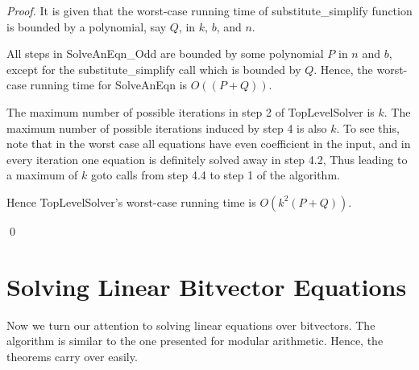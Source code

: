 \begin{proof}
It is given that the worst-case running time of substitute\_simplify
function is bounded by a polynomial, say $Q$, in $k$, $b$, and
$n$.

All steps in SolveAnEqn\_Odd are bounded by some polynomial $P$ in $n$
and $b$, except for the substitute\_simplify call which is bounded by
$Q$. Hence, the worst-case running time for SolveAnEqn is $O((P+Q))$.

The maximum number of possible iterations in step 2 of TopLevelSolver
is $k$. The maximum number of possible iterations induced by step 4 is
also $k$. To see this, note that in the worst case all equations have
even coefficient in the input, and in every iteration one equation is
definitely solved away in step 4.2, Thus leading to a maximum of $k$
goto calls from step 4.4 to step 1 of the algorithm.

Hence TopLevelSolver's worst-case running time is $O(k^2(P+Q))$.  

\qed
\end{proof}

\section{Solving Linear Bitvector Equations}
Now we turn our attention to solving linear equations over
bitvectors. The algorithm is similar to the one presented for modular
arithmetic. Hence, the theorems carry over easily.

